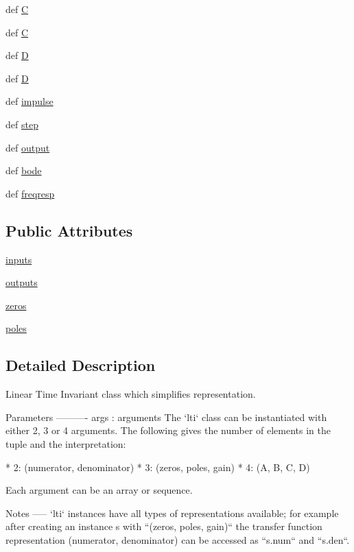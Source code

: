 \begin{DoxyCompactItemize}
def \hyperlink{classscipy_1_1signal_1_1ltisys_1_1lti_a701b85514e431501f0e937e6e39e00f3}{C}
\item 
def \hyperlink{classscipy_1_1signal_1_1ltisys_1_1lti_a701b85514e431501f0e937e6e39e00f3}{C}
\item 
def \hyperlink{classscipy_1_1signal_1_1ltisys_1_1lti_a4c88fc6009148cf5b8d399de0bdf83cd}{D}
\item 
def \hyperlink{classscipy_1_1signal_1_1ltisys_1_1lti_a4c88fc6009148cf5b8d399de0bdf83cd}{D}
\item 
def \hyperlink{classscipy_1_1signal_1_1ltisys_1_1lti_a4fe2d5bc573ebc802e55dfc66da384e1}{impulse}
\item 
def \hyperlink{classscipy_1_1signal_1_1ltisys_1_1lti_a0a072534b844e2b7ab26b8e192d1ef30}{step}
\item 
def \hyperlink{classscipy_1_1signal_1_1ltisys_1_1lti_a51e79d3867c77786a4e69433a4261bb2}{output}
\item 
def \hyperlink{classscipy_1_1signal_1_1ltisys_1_1lti_a850bce4fd08abad5a8aa7bbd3938ad66}{bode}
\item 
def \hyperlink{classscipy_1_1signal_1_1ltisys_1_1lti_af176ab6c0eb06425ca7e392b77694014}{freqresp}
\end{DoxyCompactItemize}
\subsection*{Public Attributes}
\begin{DoxyCompactItemize}
\item 
\hyperlink{classscipy_1_1signal_1_1ltisys_1_1lti_a62bd5131a43416901c4ce6ec549210e7}{inputs}
\item 
\hyperlink{classscipy_1_1signal_1_1ltisys_1_1lti_ab6a912ffa9d79d13b2eec6dc0281f319}{outputs}
\item 
\hyperlink{classscipy_1_1signal_1_1ltisys_1_1lti_a3d62ea1e21f611b30d68bca12f7dc7c5}{zeros}
\item 
\hyperlink{classscipy_1_1signal_1_1ltisys_1_1lti_a1efdd521fe48a6c8d1851695841f6207}{poles}
\end{DoxyCompactItemize}


\subsection{Detailed Description}
\begin{DoxyVerb}Linear Time Invariant class which simplifies representation.

Parameters
----------
args : arguments
    The `lti` class can be instantiated with either 2, 3 or 4 arguments.
    The following gives the number of elements in the tuple and the
    interpretation:

        * 2: (numerator, denominator)
        * 3: (zeros, poles, gain)
        * 4: (A, B, C, D)

    Each argument can be an array or sequence.

Notes
-----
`lti` instances have all types of representations available; for example
after creating an instance s with ``(zeros, poles, gain)`` the transfer
function representation (numerator, denominator) can be accessed as
``s.num`` and ``s.den``.\end{DoxyVerb}
 

